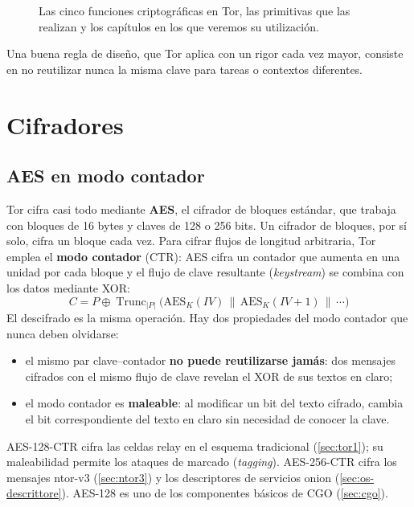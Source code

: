 \begin{figure}[htbp]
\centering

\caption{Las cinco funciones criptográficas en Tor, las primitivas que las realizan y los capítulos en los que veremos su utilización.}
\label{fig:compiti}
\end{figure}

Una buena regla de diseño, que Tor aplica con un rigor cada vez mayor, consiste en no reutilizar nunca la misma clave para tareas o contextos diferentes.

\section{Cifradores}\label{sec:cripto-cifrari}

\subsection{AES en modo contador}

Tor cifra casi todo mediante \textbf{AES}, el cifrador de bloques estándar, que trabaja con bloques de 16 bytes y claves de 128 o 256 bits. Un cifrador de bloques, por sí solo, cifra un bloque cada vez. Para cifrar flujos de longitud arbitraria, Tor emplea el \textbf{modo contador} (CTR): AES cifra un contador que aumenta en una unidad por cada bloque y el flujo de clave resultante (\emph{keystream}) se combina con los datos mediante XOR:
\[ C = P \oplus \operatorname{Trunc}_{|P|}\bigl(\mathrm{AES}_K(\mathit{IV}) \,\|\, \mathrm{AES}_K(\mathit{IV}+1) \,\|\, \cdots\bigr) \]
El descifrado es la misma operación. Hay dos propiedades del modo contador que nunca deben olvidarse:
\begin{itemize}
  \item el mismo par clave--contador \textbf{no puede reutilizarse jamás}: dos mensajes cifrados con el mismo flujo de clave revelan el XOR de sus textos en claro;
  \item el modo contador es \textbf{maleable}: al modificar un bit del texto cifrado, cambia el bit correspondiente del texto en claro sin necesidad de conocer la clave.
\end{itemize}

AES-128-CTR cifra las celdas relay en el esquema tradicional (\cref{sec:tor1}); su maleabilidad permite los ataques de marcado (\emph{tagging}). AES-256-CTR cifra los mensajes ntor-v3 (\cref{sec:ntor3}) y los descriptores de servicios onion (\cref{sec:os-descrittore}). AES-128 es uno de los componentes básicos de CGO (\cref{sec:cgo}).

